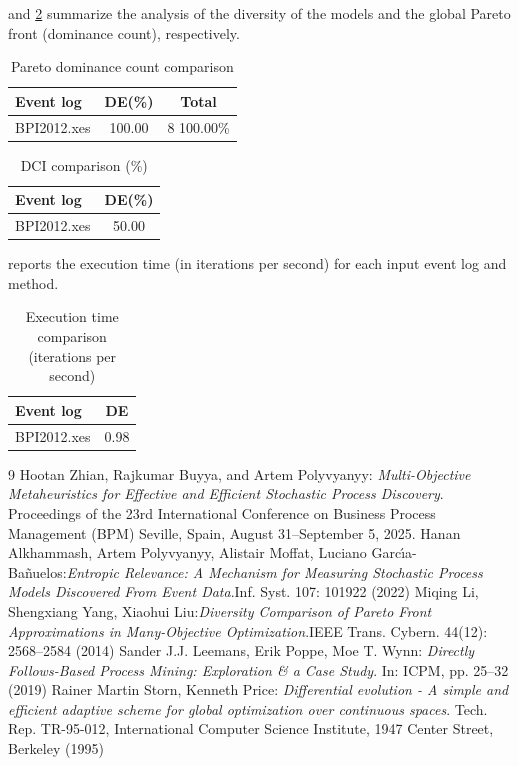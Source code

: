 \documentclass{article}
\begin{document}
\noindent
{} and \cref{tbl:dci} summarize the analysis of the diversity of the models and the global Pareto front (dominance count), respectively.
\begin{table}[h!]
\centering
\caption{Pareto dominance count comparison}
\label{tbl:dominance:count}
\setlength{\tabcolsep}{6pt}
\fontsize{8}{10}\selectfont
\begin{tabular}{lcc}
\toprule
Event log &DE(\%)&Total\\
\midrule
BPI2012.xes&100.00&8 100.00\%\\
\bottomrule
\end{tabular}
\end{table}
\begin{table}[h!]
\centering
\caption{DCI comparison (\%)}
\label{tbl:dci}
\setlength{\tabcolsep}{6pt}
\fontsize{8}{10}\selectfont
\begin{tabular}{lc}
\toprule
Event log &DE(\%)\\
\midrule
BPI2012.xes&50.00\\
\bottomrule
\end{tabular}
\end{table}
 reports the execution time (in iterations per second) for each input event log and method.
\begin{table}[h!]
\centering
\caption{Execution time comparison (iterations per second)}
\label{tbl:execution:time}
\setlength{\tabcolsep}{6pt}
\fontsize{8}{10}\selectfont
\begin{tabular}{lc}
\toprule
Event log &DE\\
\midrule
BPI2012.xes&0.98\\
\bottomrule
\end{tabular}
\end{table}
\begin{thebibliography}{9}
Hootan Zhian, Rajkumar Buyya, and Artem Polyvyanyy: \emph{Multi-Objective Metaheuristics for Effective and Efficient Stochastic Process Discovery}. Proceedings of the 23rd International Conference on Business Process Management (BPM) Seville, Spain, August 31–September 5, 2025.
Hanan Alkhammash, Artem Polyvyanyy, Alistair Moffat, Luciano Garc{\'{\i}}a{-}Ba{\~{n}}uelos:\emph{Entropic Relevance: A Mechanism for Measuring Stochastic Process Models Discovered From Event Data}.Inf. Syst. 107: 101922 (2022)
Miqing Li, Shengxiang Yang, Xiaohui Liu:\emph{Diversity Comparison of Pareto Front Approximations in Many-Objective Optimization}.IEEE Trans. Cybern. 44(12): 2568--2584 (2014)
Sander J.J. Leemans, Erik Poppe, Moe T. Wynn: \emph{Directly Follows-Based Process Mining: Exploration \& a Case Study}. In: ICPM, pp. 25–32 (2019)
Rainer Martin Storn, Kenneth Price: \emph{Differential evolution - A simple and efficient adaptive scheme for global optimization over continuous spaces}. Tech. Rep. TR-95-012, International Computer Science Institute, 1947 Center Street, Berkeley (1995)
\end{thebibliography}
\appendix
\end{document}
